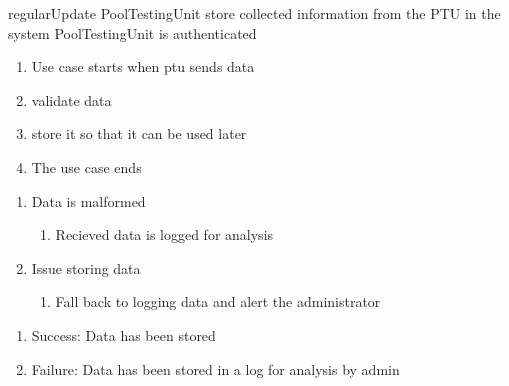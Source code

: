\usecase
{regularUpdate}
{PoolTestingUnit}
{store collected information from the PTU in the system}
{PoolTestingUnit is authenticated}
{
\begin{enumerate}
\item Use case starts when ptu sends data
\item validate data
\item store it so that it can be used later
\item The use case ends
\end{enumerate}
}
{
\begin{enumerate}
\item Data is malformed
\begin{enumerate}
\item Recieved data is logged for analysis
\end{enumerate}
\item Issue storing data
\begin{enumerate}
\item Fall back to logging data and alert the administrator
\end{enumerate}
\end{enumerate}
}
{\begin{enumerate}
\item Success: Data has been stored
\item Failure: Data has been stored in a log for analysis by admin
\end{enumerate}}

